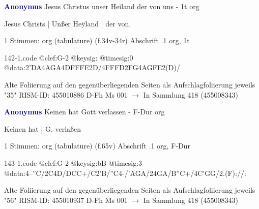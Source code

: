 \documentclass[twocolumn]{book}
\begin{document}
\newline \par \vspace{7pt} \textcolor{darkblue}{\textbf{Anonymus  }}
\newline Jesus Christus unser Heiland der von uns - 1t
\newline org
\newline \begin{itshape}[f.35r, at left:] Jesus Christs | Unßer Heÿland | der von.\end{itshape} 
\newline \textcolor{darkblue}{}  1 Stimmen: org (tabulature)  (f.34v-34r)
\newline Abschrift
.1  org, 1t  
\begin{filecontents*}{142-1.code}
@clef:G-2
@keysig:
@timesig:0
@data:2'DA4AGA4DFFFE2D/4FFFD2FG4AGFE2(D)/
\end{filecontents*}
\newline
%
\newline Alte Foliierung auf den gegenüberliegenden Seiten als Aufschlagfoliierung jeweils "35"
\newline RISM-ID: 455010886
\newline D-Fh  Ms 001
\newline $\rightarrow$ In Sammlung 418 (455008343)
      
\newline \par \vspace{7pt} \textcolor{darkblue}{\textbf{Anonymus  }}
\newline Keinen hat Gott verlassen - F-Dur
\newline org
\newline \begin{itshape}[f.65v, at left:] Keinen hat | G. verlaßen\end{itshape} 
\newline \textcolor{darkblue}{}  1 Stimmen: org (tabulature)  (f.65v)
\newline Abschrift
.1  org, F-Dur  
\begin{filecontents*}{143-1.code}
@clef:G-2
@keysig:bB
@timesig:3
@data:4--''C/2C4D/DCC+/C2'B/''C4-/'AGA/24GA/B''C+/4C'GG/2.(F)://:
\end{filecontents*}
\newline
%
\newline Alte Foliierung auf den gegenüberliegenden Seiten als Aufschlagfoliierung jeweils "56"
\newline RISM-ID: 455010937
\newline D-Fh  Ms 001
\newline $\rightarrow$ In Sammlung 418 (455008343)
      
\end{document}
